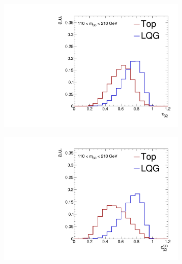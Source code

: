 \begin{figure}[]
    \begin{center}
        \begin{subfigure}[t]{0.32\textwidth}
            \includegraphics[width=\textwidth]{figures/toptagging/shapes/mass_fjTau32.pdf}
            \caption{}
        \end{subfigure}
        \begin{subfigure}[t]{0.32\textwidth}
            \includegraphics[width=\textwidth]{figures/toptagging/shapes/mass_fjTau32SD.pdf}
            \caption{}
        \end{subfigure}
        \begin{subfigure}[t]{0.32\textwidth}

\end{subfigure}
\end{center}
\end{figure}
